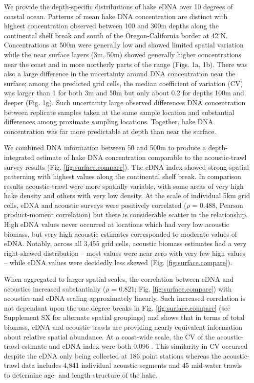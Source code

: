 \documentclass[
]{article}
\begin{document}
We provide the depth-specific distributions of hake eDNA over 10 degrees
of coastal ocean. Patterns of mean hake DNA concentration are distinct
with highest concentration observed between 100 and 300m depths along
the continental shelf break and south of the Oregon-California border at
42\(^{\circ}\)N. Concentrations at 500m were generally low and showed
limited spatial variation while the near surface layers (3m, 50m) showed
generally higher concentrations near the coast and in more northerly
parts of the range (Figs. 1a, 1b). There was also a large difference in
the uncertainty around DNA concentration near the surface; among the
predicted grid cells, the median coefficient of variation (CV) was
larger than 1 for both 3m and 50m but only about 0.2 for depths 100m and
deeper (Fig. 1g). Such uncertainty large observed differences DNA
concentration between replicate samples taken at the same sample
location and substantial differences among proximate sampling locations.
Together, hake DNA concentration was far more predictable at depth than
near the surface.

We combined DNA information between 50 and 500m to produce a
depth-integrated estimate of hake DNA concentration comparable to the
acoustic-trawl survey results (Fig. \ref{fig:surface.compare}). The eDNA
index showed strong spatial patterning with highest values along the
continental shelf break. In comparison results acoustic-trawl were more
spatially variable, with some areas of very high hake density and others
with very low density. At the scale of individual 5km grid cells, eDNA
and acoustic surveys were positively correlated (\(\rho\) = 0.488,
Pearson product-moment correlation) but there is considerable scatter in
the relationship. High eDNA values never occurred at locations which had
very low acoustic biomass, but very high acoustic estimates corresponded
to moderate values of eDNA. Notably, across all 3,455 grid cells,
acoustic biomass estimates had a very right-skewed distribution -- most
values were near zero with very few high values -- while eDNA values
were decidedly less skewed (Fig. \ref{fig:surface.compare}).

When aggregated to larger spatial scales, the correlation between eDNA
and acoustics increased substantially (\(\rho\) = 0.821; Fig.
\ref{fig:surface.compare}) with acoustics and eDNA scaling approximately
linearly. Such increased correlation is not dependant upon the one
degree breaks in Fig. \ref{fig:surface.compare} (see Supplement SX for
alternate spatial groupings) and shows that in terms of total biomass,
eDNA and acoustic-trawls are providing nearly equivalent information
about relative spatial abundance. At a coast-wide scale, the CV of the
acoustic-trawl estimate and eDNA index were both 0.096 . This similarity
in CV occurred despite the eDNA only being collected at 186 point
stations whereas the acoustic-trawl data includes 4,841 individual
acoustic segments and 45 mid-water trawls to determine age- and
length-structure of the hake.
\end{document}
